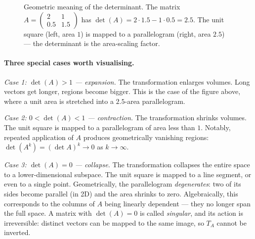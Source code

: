 \documentclass[11pt, a4paper, oneside]{article}
\begin{document}
\begin{figure}[H]
\caption{Geometric meaning of the determinant. The matrix
$A = \begin{pmatrix} 2 & 1 \\ 0.5 & 1.5 \end{pmatrix}$ has
$\det(A) = 2 \cdot 1.5 - 1 \cdot 0.5 = 2.5$. The unit square (left,
area $1$) is mapped to a parallelogram (right, area $2.5$) — the
determinant is the area-scaling factor.}
\label{fig:determinant-stretching}
\end{figure}

\paragraph{Three special cases worth visualising.}

\emph{Case 1: $\det(A) > 1$ — expansion.} The transformation enlarges
volumes. Long vectors get longer, regions become bigger. This is the
case of the figure above, where a unit area is stretched into a
$2.5$-area parallelogram.

\emph{Case 2: $0 < \det(A) < 1$ — contraction.} The transformation
shrinks volumes. The unit square is mapped to a parallelogram of area
less than $1$. Notably, repeated application of $A$ produces
geometrically vanishing regions: $\det(A^k) = (\det A)^k \to 0$ as
$k \to \infty$.

\emph{Case 3: $\det(A) = 0$ — collapse.} The transformation collapses
the entire space to a lower-dimensional subspace. The unit square is
mapped to a line segment, or even to a single point. Geometrically,
the parallelogram \emph{degenerates}: two of its sides become
parallel (in 2D) and the area shrinks to zero. Algebraically, this
corresponds to the columns of $A$ being linearly dependent — they no
longer span the full space. A matrix with $\det(A) = 0$ is called
\emph{singular}, and its action is irreversible: distinct vectors can
be mapped to the same image, so $T_A$ cannot be inverted.
\end{document}
